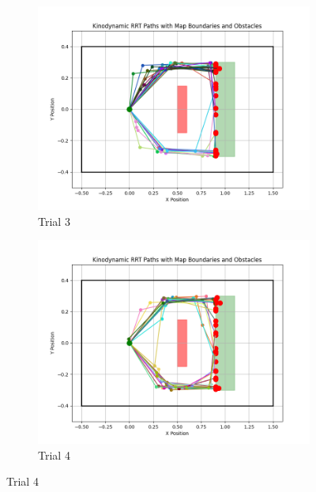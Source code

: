 \documentclass[12pt]{article}
\begin{document}
\begin{figure}[h!]
    \vspace{0.5cm} %

    \begin{subfigure}{0.45\textwidth}
        \centering
        \includegraphics[width=\textwidth]{./images/20.png}
        \caption{Trial 3}
        \label{fig:tree_3}
    \end{subfigure}
    \hfill
    \begin{subfigure}{0.45\textwidth}
        \centering
        \includegraphics[width=\textwidth]{./images/30.png}
        \caption{Trial 4}
        \label{fig:tree_4}
    \end{subfigure}


\end{figure}
\end{document}
